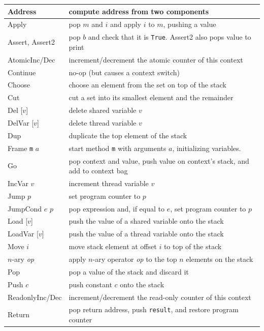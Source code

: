 \documentclass{report}
\begin{document}
{\small
\begin{tabular}{|l|l|}
\hline
Address & compute address from two components \\
\hline
Apply & pop $m$ and $i$ and apply $i$ to $m$, pushing a value \\
\hline
Assert, Assert2 & pop $b$ and check that it is \texttt{True}.  Assert2 also pops value to print \\
\hline
AtomicInc/Dec & increment/decrement the atomic counter of this context \\
\hline
Continue & no-op (but causes a context switch) \\
\hline
Choose & choose an element from the set on top of the stack \\
\hline
Cut & cut a set into its smallest element and the remainder \\
\hline
Del [$v$] & delete shared variable $v$ \\
\hline
DelVar [$v$] & delete thread variable $v$ \\
\hline
Dup & duplicate the top element of the stack \\
\hline
Frame \texttt{m} $a$ & start method \texttt{m} with arguments $a$,
initializing variables.  \\
\hline
Go & pop context and value, push value on context's stack, and add to context bag \\
\hline
IncVar $v$ & increment thread variable $v$ \\
\hline
Jump $p$ & set program counter to $p$ \\
\hline
JumpCond $e$ $p$ & pop expression and, if equal to $e$, set program counter to $p$ \\
\hline
Load [$v$] & push the value of a shared variable onto the stack \\
\hline
LoadVar [$v$] & push the value of a thread variable onto the stack \\
\hline
Move $i$ & move stack element at offset $i$ to top of the stack \\
\hline
$n$-ary \textit{op} & apply $n$-ary operator \textit{op} to the top $n$ elements on the stack \\
\hline
Pop & pop a value of the stack and discard it \\
\hline
Push $c$ & push constant $c$ onto the stack \\
\hline
ReadonlyInc/Dec & increment/decrement the read-only counter of this context \\
\hline
Return & pop return address, push \texttt{result}, and restore program counter \\

\end{tabular}}
\end{document}
